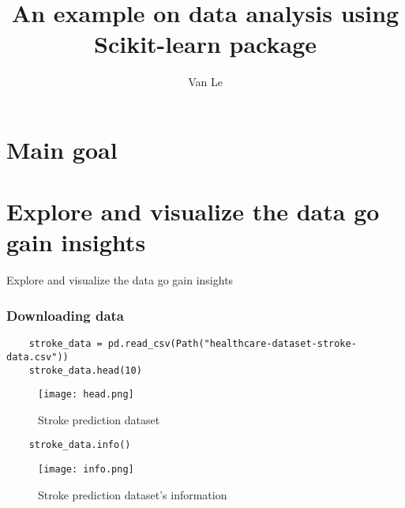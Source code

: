 \documentclass[10pt]{beamer}
\author[nle12@vols.utk.edu]{Van Le }
\institute[UTK] %
{
		Department of Mathematics\\
	The University of Tennessee, Knoxville\\

}
\theoremstyle{definition}
\theoremstyle{remark}
\numberwithin{equation}{section}
\begin{document}
	\title[Introduction to machine learning]{An example on data analysis using Scikit-learn package}
	\frame{\titlepage}
	\frame
	{
			\tableofcontents
	}


\section{Main goal}

\section{Explore and visualize the data go gain insights}
\begin{frame}
	\centering Explore and visualize the data go gain insights
\end{frame}

\begin{frame}[fragile]
	\frametitle{Downloading data}
\begin{lstlisting}
	stroke_data = pd.read_csv(Path("healthcare-dataset-stroke-data.csv")) 
	stroke_data.head(10)
\end{lstlisting}

\begin{figure}[h]
	\caption{Stroke prediction dataset}
	\centering
	\texttt{[image: head.png]}
\end{figure}

\end{frame}



\begin{frame}[fragile]
\begin{lstlisting}
	stroke_data.info()
\end{lstlisting}
	
	\begin{figure}[h]
		\caption{Stroke prediction dataset's information}
		\centering
		\texttt{[image: info.png]}
	\end{figure}
	
\end{frame}
\end{document}
